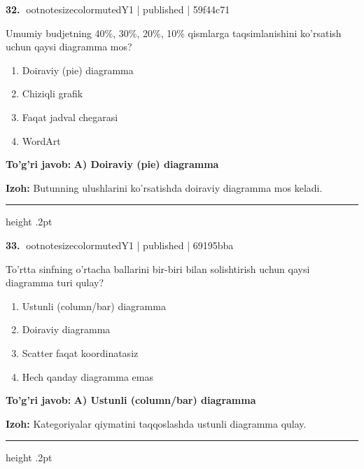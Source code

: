 \documentclass[10pt,a4paper]{article}
\begin{document}
\textbf{\color{ink}32.} {ootnotesizecolor{muted}Y1 | published | 59f44c71}
\par
Umumiy budjetning 40\%, 30\%, 20\%, 10\% qismlarga taqsimlanishini ko'rsatish uchun qaysi diagramma mos?
\begin{enumerate}[label=\Alph*),leftmargin=9mm]
\item Doiraviy (pie) diagramma
\item Chiziqli grafik
\item Faqat jadval chegarasi
\item WordArt
\end{enumerate}
\begin{tcolorbox}[enhanced,breakable,colback=teal!4,colframe=teal!55!black,boxrule=0.45pt,arc=1.2mm,left=2.8mm,right=2.8mm,top=2mm,bottom=2mm]
\textbf{\color{teal}To'g'ri javob:} \textbf{A) Doiraviy (pie) diagramma}
\par\smallskip
\textbf{Izoh:} Butunning ulushlarini ko'rsatishda doiraviy diagramma mos keladi.
\end{tcolorbox}
\vspace{2mm}\hrule height .2pt\vspace{2mm}

\textbf{\color{ink}33.} {ootnotesizecolor{muted}Y1 | published | 69195bba}
\par
To'rtta sinfning o'rtacha ballarini bir-biri bilan solishtirish uchun qaysi diagramma turi qulay?
\begin{enumerate}[label=\Alph*),leftmargin=9mm]
\item Ustunli (column/bar) diagramma
\item Doiraviy diagramma
\item Scatter faqat koordinatasiz
\item Hech qanday diagramma emas
\end{enumerate}
\begin{tcolorbox}[enhanced,breakable,colback=teal!4,colframe=teal!55!black,boxrule=0.45pt,arc=1.2mm,left=2.8mm,right=2.8mm,top=2mm,bottom=2mm]
\textbf{\color{teal}To'g'ri javob:} \textbf{A) Ustunli (column/bar) diagramma}
\par\smallskip
\textbf{Izoh:} Kategoriyalar qiymatini taqqoslashda ustunli diagramma qulay.
\end{tcolorbox}
\vspace{2mm}\hrule height .2pt\vspace{2mm}
\end{document}
